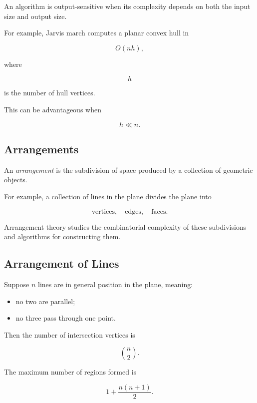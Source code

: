 An algorithm is output-sensitive when its complexity depends on both the
input size and output size.

For example, Jarvis march computes a planar convex hull in

\[
\boxed{
O(nh),
}
\]

where

\[
h
\]

is the number of hull vertices.

This can be advantageous when

\[
h\ll n.
\]

\subsection{Arrangements}
\label{subsec:geometric-arrangements}

An \emph{arrangement} is the subdivision of space produced by a collection
of geometric objects.

For example, a collection of lines in the plane divides the plane into

\[
\boxed{
\text{vertices},
\quad
\text{edges},
\quad
\text{faces}.
}
\]

Arrangement theory studies the combinatorial complexity of these
subdivisions and algorithms for constructing them.

\subsection{Arrangement of Lines}
\label{subsec:arrangement-lines}

Suppose \(n\) lines are in general position in the plane, meaning:

\begin{itemize}
    \item no two are parallel;
    \item no three pass through one point.
\end{itemize}

Then the number of intersection vertices is

\[
\boxed{
\binom{n}{2}.
}
\]

The maximum number of regions formed is

\[
\boxed{
1+\frac{n(n+1)}{2}.
}
\]


